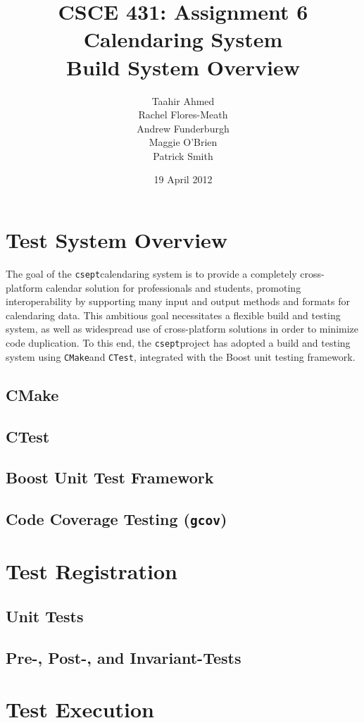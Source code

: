 \documentclass[titlepage]{article}
\title{%
CSCE 431: Assignment 6 \\
\csept Calendaring System \\
Build System Overview
}
\author{%
Taahir Ahmed \\
Rachel Flores-Meath \\
Andrew Funderburgh \\
Maggie O'Brien \\
Patrick Smith
}
\date{%
19 April 2012
}
\newcommand{\csept}{\texttt{csept}\space}
\newcommand{\gcov}{\texttt{gcov}\space}
\newcommand{\cmake}{\texttt{CMake}\space}
\newcommand{\ctest}{\texttt{CTest}\xspace}
\begin{document}
\maketitle
\tableofcontents

\section{Test System Overview}

The goal of the \csept calendaring system is to provide a completely
cross-platform calendar solution for professionals and students, promoting
interoperability by supporting many input and output methods and formats for
calendaring data.  This ambitious goal necessitates a flexible build and testing
system, as well as widespread use of cross-platform solutions in order to
minimize code duplication.  To this end, the \csept project has adopted a build
and testing system using \cmake and \ctest, integrated with the Boost unit
testing framework.

\subsection{CMake}

\subsection{CTest}

\subsection{Boost Unit Test Framework}

\subsection{Code Coverage Testing (\gcov)}

\section{Test Registration}

\subsection{Unit Tests}

\subsection{Pre-, Post-, and Invariant-Tests}

\section{Test Execution}
\end{document}
